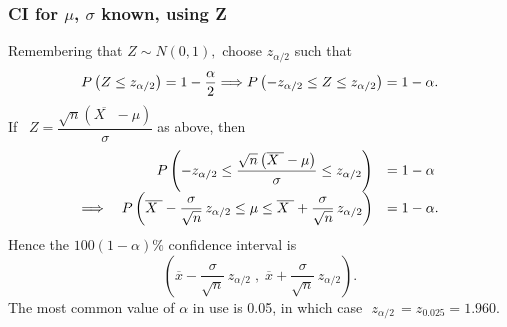 \documentclass[xcolor=dvipsnames]{beamer}
\begin{document}
\begin{frame}
\frametitle{CI for $\mu$, $\sigma$ known, using Z}
Remembering that $Z\sim N(0,1),$ choose $z_{\alpha/2}$ such that
\[%
\begin{array}
[c]{rl}%
P\left(  Z\leq z_{\alpha/2}\right)  =1-\dfrac{\alpha}{2} \Longrightarrow P\left(  -z_{\alpha/2}\leq Z\leq z_{\alpha/2}\right) =1-\alpha.
\end{array}
\]
If \ $Z=\dfrac{\sqrt{n}\left(  \overline{X\text{ }}-\mu\right)  }{\sigma}\;$as
above, then
\[%
\begin{array}
[c]{rl}%
P\left(  -z_{\alpha/2}\leq\dfrac{\sqrt{n}\left(  \overline{X\text{ }}%
-\mu\right)  }{\sigma}\leq z_{\alpha/2}\right)  & =1-\alpha\\
\Longrightarrow\quad P\left(  \overline{X\text{ }}-\dfrac{\sigma}{\sqrt{n}%
}\,z_{\alpha/2}\leq\mu\leq\overline{X\text{ }}+\dfrac{\sigma}{\sqrt{n}%
}\,z_{\alpha/2}\right)  & =1-\alpha.
\end{array}
\]
Hence the  $100\left(  1-\alpha\right)  \%$ confidence interval is%
\[
\left(  \overline{x}-\frac{\sigma}{\sqrt{n}}\,z_{\alpha/2}\;,\;\overline
{x}+\frac{\sigma}{\sqrt{n}}\,z_{\alpha/2}\right)  .
\]
The most common value of $\alpha$ in use is 0.05, in which case $\,\,z_{\alpha
/2}\,=z_{0.025}=1.960.$%

\end{frame}


\end{document}

